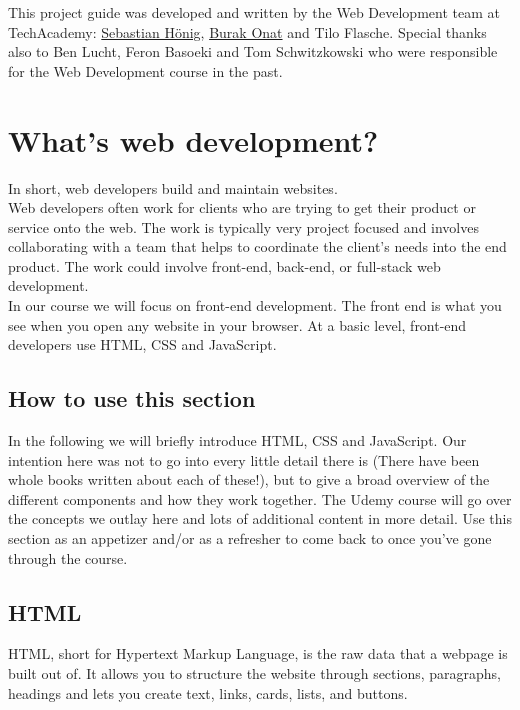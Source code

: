 \documentclass[
]{article}
\begin{document}
This project guide was developed and written by the Web Development team at TechAcademy: \href{https://www.linkedin.com/in/sebastian-hönig/}{Sebastian Hönig}, \href{https://www.linkedin.com/in/tburakonat/}{Burak Onat} and Tilo Flasche. Special thanks also to Ben Lucht, Feron Basoeki and Tom Schwitzkowski who were responsible for the Web Development course in the past.

\hypertarget{whats-web-development}{%
\section{What's web development?}\label{whats-web-development}}

In short, web developers build and maintain websites.\\
Web developers often work for clients who are trying to get their product or service onto the web. The work is typically very project focused and involves collaborating with a team that helps to coordinate the client's needs into the end product. The work could involve front-end, back-end, or full-stack web development.\\
In our course we will focus on front-end development. The front end is what you see when you open any website in your browser. At a basic level, front-end developers use HTML, CSS and JavaScript.

\hypertarget{how-to-use-this-section}{%
\subsection{How to use this section}\label{how-to-use-this-section}}

In the following we will briefly introduce HTML, CSS and JavaScript. Our intention here was not to go into every little detail there is (There have been whole books written about each of these!), but to give a broad overview of the different components and how they work together. The Udemy course will go over the concepts we outlay here and lots of additional content in more detail. Use this section as an appetizer and/or as a refresher to come back to once you've gone through the course.

\hypertarget{html}{%
\subsection{HTML}\label{html}}

HTML, short for Hypertext Markup Language, is the raw data that a webpage is built out of. It allows you to structure the website through sections, paragraphs, headings and lets you create text, links, cards, lists, and buttons.
\end{document}
